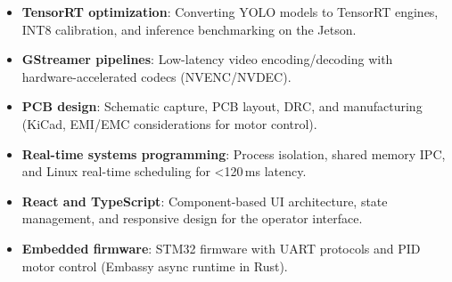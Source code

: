 \documentclass{article}
\begin{document}
\begin{itemize}
  \item \textbf{TensorRT optimization}: Converting YOLO models to TensorRT
        engines, INT8 calibration, and inference benchmarking on the Jetson.
  \item \textbf{GStreamer pipelines}: Low-latency video encoding/decoding with
        hardware-accelerated codecs (NVENC/NVDEC).
  \item \textbf{PCB design}: Schematic capture, PCB layout, DRC, and
        manufacturing (KiCad, EMI/EMC considerations for motor control).
  \item \textbf{Real-time systems programming}: Process isolation, shared
        memory IPC, and Linux real-time scheduling for
        \textless{}120\,ms latency.
  \item \textbf{React and TypeScript}: Component-based UI architecture, state
        management, and responsive design for the operator interface.
  \item \textbf{Embedded firmware}: STM32 firmware with UART protocols and PID
        motor control (Embassy async runtime in Rust).
\end{itemize}




\end{document}
